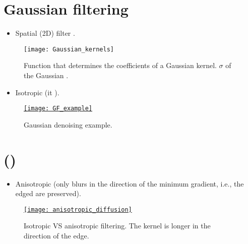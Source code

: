 \section{Gaussian filtering \cite{gonzalez2009digital}}
\begin{itemize}
\item Spatial (2D) filter  .
\end{itemize}

\begin{figure}[H]
  \vspace{-1ex}
  \centering
  \texttt{[image: Gaussian\_kernels]}
  \caption[The Gaussian kernel.]{Function that determines the
    coefficients of a Gaussian kernel. $\sigma$  of the
    Gaussian .}
  \label{fig:gaussian_kernel}
\end{figure}

\begin{itemize}
\item Isotropic (it ).
\end{itemize}

\begin{figure}[H]
  \vspace{-0ex}
  \centering
  \href{https://www.cloudfactory.com/blog/gaussian-noise-medical-ai}{\texttt{[image: GF\_example]}}
  \caption{Gaussian denoising example.}
  \label{fig:gaussian_denoising_example}
\end{figure}

\section{ () \cite{gonzalez2009digital}}
\begin{itemize}
\item Anisotropic (only blurs in the direction of the minimum
  gradient, i.e., the edged are preserved).
\end{itemize}

\begin{figure}[H]
  \vspace{-0ex}
  \centering
  \href{https://dsp.stackexchange.com/questions/14606/anisotropic-diffusion}{\texttt{[image: anisotropic\_diffusion]}}
  \caption[Isotropic VS anisotropic filtering.]{Isotropic VS
    anisotropic filtering. The kernel is longer in the direction of
    the edge.}
  \label{fig:AND_filtering}
\end{figure}

